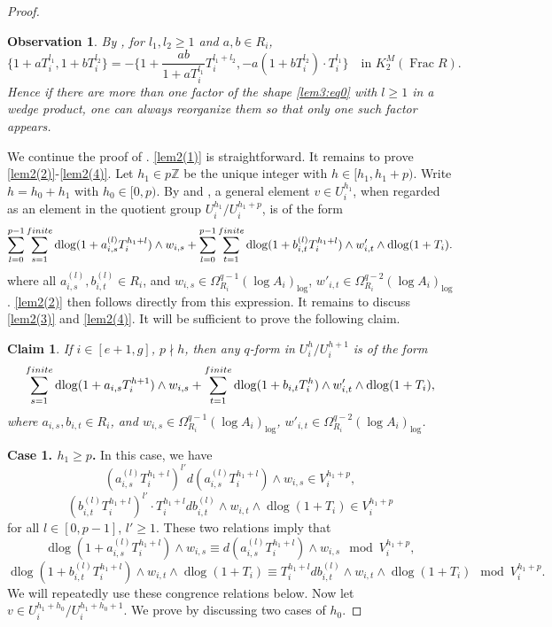 \documentclass[11pt]{amsart}
\newcommand{\eq}[2]{\begin{equation}\label{#1}#2 \end{equation}}
\newcommand{\Z}{\mathbb{Z}}
\newcommand{\Frac}{\operatorname{Frac}}
\newcommand{\dlog}{\operatorname{dlog}}
\theoremstyle{plain}
\newtheorem{claim}{Claim}[prop]
\newtheorem{Observation}{Observation}[prop]
\theoremstyle{definition}
\numberwithin{equation}{prop}
\begin{document}
\begin{proof}
\begin{Observation}\label{obs2}
By \cite[Lemma 2.7(1)]{RS18}, for $l_1,l_2\ge 1$ and $a,b\in R_i$,
$$\{1+aT_i^{l_1},1+bT_i^{l_2}\}=-\{1+\frac{ab}{1+aT_i^{l_1}}T_i^{l_1+l_2},-a(1+bT_i^{l_2})\cdot T_i^{l_1}\}
\quad\text{in $K^M_2(\Frac R)$.}$$
Hence if there are more than one factor of the shape \eqref{lem3:eq0} with $l\ge 1$ in a wedge product, one can always reorganize them so that only one such factor appears.
\end{Observation}

We continue the proof of .
\eqref{lem2(1)} is straightforward.
It remains to prove \eqref{lem2(2)}-\eqref{lem2(4)}.
Let $h_1\in p\Z$ be the unique integer with $h\in[h_1,h_1+p)$.
Write $h=h_0+h_1$ with $h_0\in [0,p)$.
By  and , a general element $v\in U^{h_1}_i$, when regarded as an element in the quotient group $U^{h_1}_i/U_i^{h_1+p}$, is of the form
\eq{genformv}{
\sum_{l=0}^{p-1}\sum_{s=1}^{\rm finite}
\dlog(1+a^{(l)}_{i,s}T_i^{h_1+l})\wedge w_{i,s}
+\sum_{l=0}^{p-1}\sum_{t=1}^{\rm finite}
\dlog(1+b^{(l)}_{i,t}T_i^{h_1+l})\wedge w'_{i,t}\wedge \dlog (1+T_i).
}
where all $a^{(l)}_{i,s}, b^{(l)}_{i,t}\in R_i$, and $w_{i,s}\in \Omega^{q-1}_{R_i}(\log A_i)_{\log}$, $w'_{i,t}\in \Omega^{q-2}_{R_i}(\log A_i)_{\log}$.
\eqref{lem2(2)} then follows directly from this expression.
It remains to discuss \eqref{lem2(3)} and \eqref{lem2(4)}.
It will be sufficient to prove the following claim.

\begin{claim}
\label{lem2(34)claim}
If $i\in [e+1,g]$, $p\nmid h$, then any $q$-form in 
$U_i^{h}/U_i^{h+1}$ is of the  form
$$
\sum_{s=1}^{\rm finite}
\dlog(1+a_{i,s}T_i^{h+1})\wedge w_{i,s}
+
\sum_{t=1}^{\rm finite}
\dlog(1+b_{i,t}T_i^{h})\wedge w'_{i,t}\wedge \dlog (1+T_i),$$
where $a_{i,s},b_{i,t}\in R_i$, and
$w_{i,s}\in \Omega^{q-1}_{R_i}(\log A_i)_{\log}$, $w'_{i,t}\in \Omega^{q-2}_{R_i}(\log A_i)_{\log}$.
\end{claim}

\textbf{Case 1. $h_1\ge p$.}
In this case, we have
$$(a^{(l)}_{i,s}T_i^{h_1+l})^{l'}d(a^{(l)}_{i,s}T_i^{h_1+l})\wedge  w_{i,s}
\in 
V_i^{h_1+p},$$
$$(b^{(l)}_{i,t}T_i^{h_1+l})^{l'}\cdot T_i^{h_1+l}db^{(l)}_{i,t}\wedge w_{i,t}\wedge \dlog (1+T_i)
\in V_i^{h_1+p}$$
for all $l\in [0,p-1]$, $l'\ge 1$.
These two relations imply that
$$\dlog(1+a^{(l)}_{i,s}T_i^{h_1+l})\wedge w_{i,s}
\equiv 
d(a^{(l)}_{i,s}T_i^{h_1+l})\wedge w_{i,s} 
\mod V_i^{h_1+p},$$
$$\dlog(1+b^{(l)}_{i,t}T_i^{h_1+l})\wedge w_{i,t}\wedge \dlog (1+T_i)
\equiv 
T_i^{h_1+l} db^{(l)}_{i,t}\wedge w_{i,t}\wedge \dlog (1+T_i)
\mod V_i^{h_1+p}.$$
We will repeatedly use these congrence relations below.
Now let $v\in U^{h_1+h_0}_i/U_i^{h_1+h_0+1}$.
We prove  by discussing two cases of $h_0$.


\end{proof}
\end{document}
